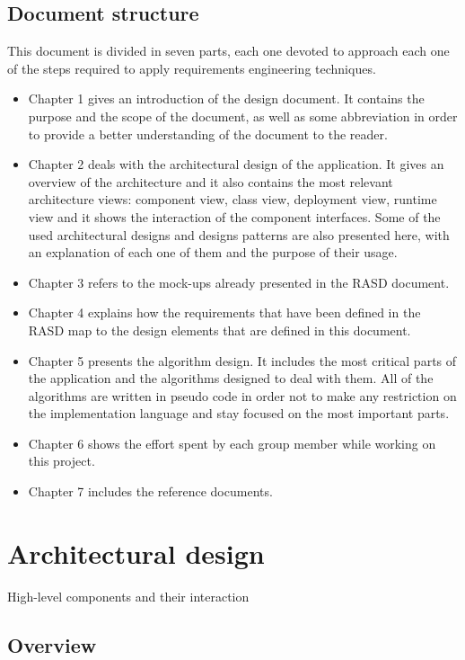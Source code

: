 \documentclass[a4paper, hidelinks, 12pt]{report}
\begin{document}
	\section{Document structure}
	This document is divided in seven parts, each one devoted to approach each one of the steps required to apply requirements engineering techniques.
	\begin{itemize}
		\item Chapter 1 gives an introduction of the design document. It contains the purpose and the scope of the document, as well as some abbreviation in order to provide a better understanding of the document to the reader.
		\item Chapter 2  deals with the architectural design of the application. It gives an overview of the architecture
and it also contains the most relevant architecture views: component view, class view, deployment view, runtime view and it shows the interaction of the component interfaces. Some of the used architectural designs and designs patterns are also presented here, with an explanation of each one of them and the purpose of their usage.

		\item Chapter 3  refers to the mock-ups already presented in the RASD document.
		\item Chapter 4 explains how the requirements that have been defined in the RASD map to the design elements that are defined in this document.
		\item Chapter 5 presents the algorithm design. It includes the most critical parts of the application and the
algorithms designed to deal with them. All of the algorithms are written in pseudo code in order not to make any restriction on the implementation language and stay focused on the most important parts.
		\item Chapter 6 shows the effort spent by each group member while working on this project.
		\item Chapter 7 includes the reference documents.
	\end{itemize}
	
	\chapter{Architectural design}
	High-level components and their interaction
	
	\section{Overview}
\end{document}
